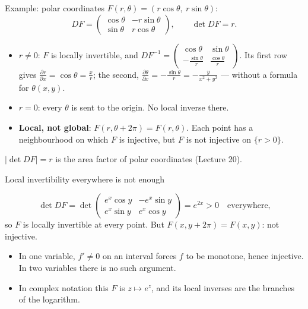 \documentclass[10pt]{wosm-slides}
\begin{document}
\begin{frame}{Example: polar coordinates}
  $F(r, \theta) = (r\cos\theta, \ r\sin\theta)$:
  \[ DF = \begin{pmatrix} \cos\theta & -r\sin\theta \\ \sin\theta & r\cos\theta \end{pmatrix}, \qquad
     \det DF = r . \]
  \pause
  \begin{itemize}
    \item $r \ne 0$: $F$ is locally invertible, and
      $DF^{-1} = \begin{pmatrix} \cos\theta & \sin\theta \\ -\frac{\sin\theta}{r} & \frac{\cos\theta}{r} \end{pmatrix}$.
      Its first row gives $\frac{\partial r}{\partial x} = \cos\theta = \frac xr$; the second,
      $\frac{\partial\theta}{\partial x} = -\frac{\sin\theta}{r} = -\frac{y}{x^2 + y^2}$ --- without a
      formula for $\theta(x, y)$.
    \pause
    \item $r = 0$: every $\theta$ is sent to the origin. No local inverse there.
    \pause
    \item \textbf{Local, not global}: $F(r, \theta + 2\pi) = F(r, \theta)$. Each point has a neighbourhood
      on which $F$ is injective, but $F$ is not injective on $\{r > 0\}$.
  \end{itemize}
  {\small $|\det DF| = r$ is the area factor of polar coordinates (Lecture 20).\par}
\end{frame}

\begin{frame}{Local invertibility everywhere is not enough}
  \begin{example}[$F(x, y) = (e^x\cos y, \ e^x\sin y)$]
    \[ \det DF = \det\begin{pmatrix} e^x\cos y & -e^x\sin y \\ e^x\sin y & e^x\cos y \end{pmatrix} = e^{2x} > 0
       \quad \text{everywhere,} \]
    so $F$ is locally invertible at every point. But $F(x, y + 2\pi) = F(x, y)$: not injective.
  \end{example}
  \pause
  \begin{itemize}
    \item In one variable, $f' \ne 0$ on an interval forces $f$ to be monotone, hence injective.
      In two variables there is no such argument.
    \item In complex notation this $F$ is $z \mapsto e^z$, and its local inverses are the branches
      of the logarithm.
  \end{itemize}
\end{frame}
\end{document}
